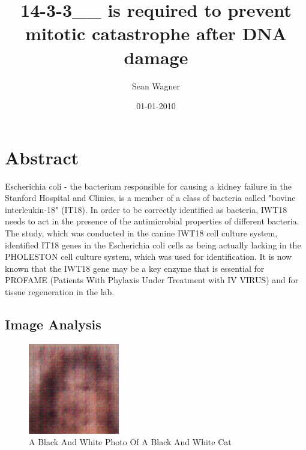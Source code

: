 \documentclass{article}%
\title{14{-}3{-}3\_\_ is required to prevent mitotic catastrophe after DNA damage}%
\author{Sean Wagner}%
\affil{Bellvitge Biomedical Research Institute (IDIBELL), Barcelona, Spain}%
\date{01{-}01{-}2010}%
\begin{document}
%
\normalsize%
\maketitle%
\section{Abstract}%
\label{sec:Abstract}%
Escherichia coli {-} the bacterium responsible for causing a kidney failure in the Stanford Hospital and Clinics, is a member of a class of bacteria called "bovine interleukin{-}18" (IT18). In order to be correctly identified as bacteria, IWT18 needs to act in the presence of the antimicrobial properties of different bacteria. The study, which was conducted in the canine IWT18 cell culture system, identified IT18 genes in the Escherichia coli cells as being actually lacking in the PHOLESTON cell culture system, which was used for identification.\newline%
It is now known that the IWT18 gene may be a key enzyme that is essential for PROFAME (Patients With Phylaxis Under Treatment with IV VIRUS) and for tissue regeneration in the lab.

%
\subsection{Image Analysis}%
\label{subsec:ImageAnalysis}%


\begin{figure}[h!]%
\centering%
\includegraphics[width=150px]{500_fake_images/samples_5_21.png}%
\caption{A Black And White Photo Of A Black And White Cat}%
\end{figure}

%
\end{document}
